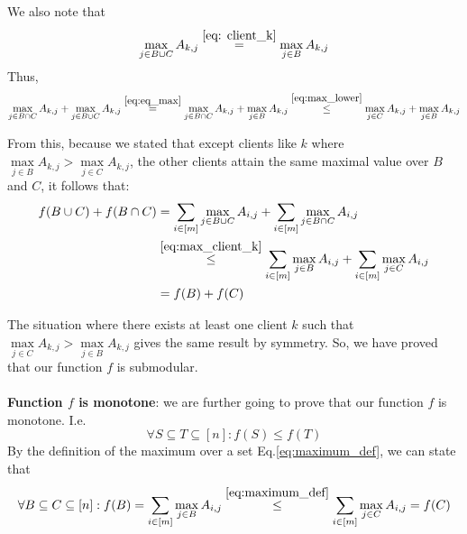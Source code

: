 \documentclass[10pt,usenames,dvipsnames]{article}
\newenvironment{exercise}[2][Exercise]{\begin{trivlist}
  \item[\hskip \labelsep {\bfseries #1}\hskip \labelsep {\bfseries #2.}]}{\end{trivlist}}
\begin{document}
\begin{exercise}{4}
We also note that
\begin{equation}
\label{eq:eq_max}
    \max\limits_{j\in B \cup C}A_{k,j} \overset{\eqref{eq: client_k}}{=} \max\limits_{j\in B}A_{k,j}
\end{equation}
Thus, 
\begin{equation}
\label{eq:max_client_k}
    \max\limits_{j\in B \cap C}A_{k,j} + \max\limits_{j\in B \cup C}A_{k,j}  \overset{\eqref{eq:eq_max}}{=}  \max\limits_{j\in B \cap C}A_{k,j} + \max\limits_{j\in B }A_{k,j}   \overset{\eqref{eq:max_lower}}{\leq}  \max\limits_{j\in C}A_{k,j} + \max\limits_{j\in B}A_{k,j}
\end{equation} 

From this, because we stated that except clients like $k$ where $\max\limits_{j\in B}A_{k,j}  > \max\limits_{j\in C}A_{k,j}$, the other clients attain the same maximal value over $B$ and $C$, it follows that: 
\begin{align*}
    f(B \cup C) + f(B \cap C) &= \sum_{i\in[m]} \max\limits_{j\in B \cup C}A_{i,j} + \sum_{i\in[m]}  \max\limits_{j\in B \cap C}A_{i,j} \\
    &\overset{\eqref{eq:max_client_k}}{\leq}
     \sum_{i\in[m]} \max\limits_{j\in B}A_{i,j} + \sum_{i\in[m]} \max\limits_{j\in C}A_{i,j} \\
     &= f(B)+f(C) 
\end{align*}

The situation where there exists at least one client $k$ such that $\max\limits_{j\in C}A_{k,j}  > \max\limits_{j\in B}A_{k,j}$ gives the same result by symmetry. So, we have proved that our function $f$ is submodular. \\ \\

\textbf{Function $f$ is monotone}: we are further going to prove that our function $f$ is monotone. I.e. 
\begin{equation}
    \label{eq:monotone}
    \forall S \subseteq T \subseteq [n]: f(S)\leq f(T)
\end{equation}
By the definition of the maximum over a set Eq.\eqref{eq:maximum_def}, we can state that 
\begin{align*}
    \forall B \subseteq C \subseteq [n]: f(B)  = \sum_{i\in[m]}  \max\limits_{j\in B}A_{i,j} 
     &\overset{\eqref{eq:maximum_def}}{\leq} 
     \sum_{i\in[m]} \max\limits_{j\in C}A_{i,j} = f(C) \\
\end{align*}


\end{exercise}
\end{document}
